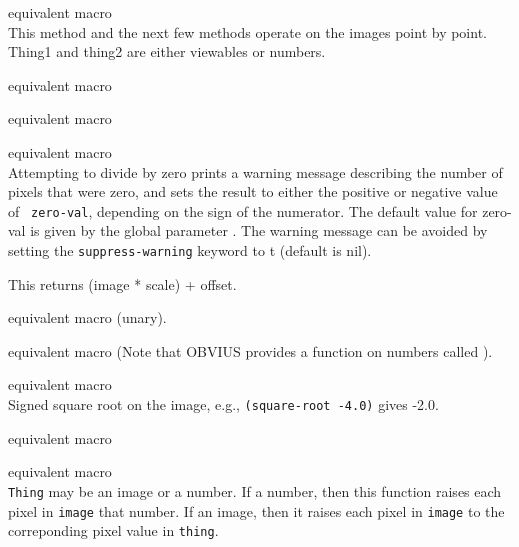 \begin{description}
\item{}
equivalent macro  \\
This method and the next few methods operate on the images point 
by point.  Thing1 and thing2 are either viewables or numbers.

\item{}
equivalent macro 

\item{}
equivalent macro 

\item{}
equivalent macro  \\ 
Attempting to divide by zero prints a 
warning message describing the number of pixels that were zero, and
sets the result to either the positive or negative value of {\tt
zero-val}, depending on the sign of the numerator.  The default value
for zero-val is given by the global parameter
.  The warning message can be avoided by
setting the {\tt suppress-warning} keyword to t (default is nil).

\item{}
This returns (image * scale) + offset.

\item{}
equivalent macro  (unary).
\item{}
equivalent macro  (Note that OBVIUS provides a function on
numbers called ).

\item{}
equivalent macro  \\ 
Signed square root on the image, e.g., {\tt (square-root -4.0)} gives -2.0.

\item{}
equivalent macro 

\item{}
equivalent macro  \\
{\tt Thing} may be an image or a number.  If a number, then this
function raises each pixel in {\tt image} that number.  If an image,
then it raises each pixel in {\tt image} to the correponding pixel
value in {\tt thing}.


\end{description}
